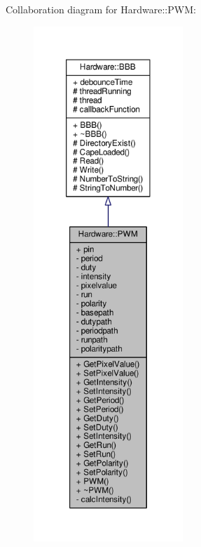 Collaboration diagram for Hardware\+:\+:P\+W\+M\+:
\nopagebreak
\begin{figure}[H]
\begin{center}
\leavevmode
\includegraphics[height=550pt]{class_hardware_1_1_p_w_m__coll__graph}
\end{center}
\end{figure}
